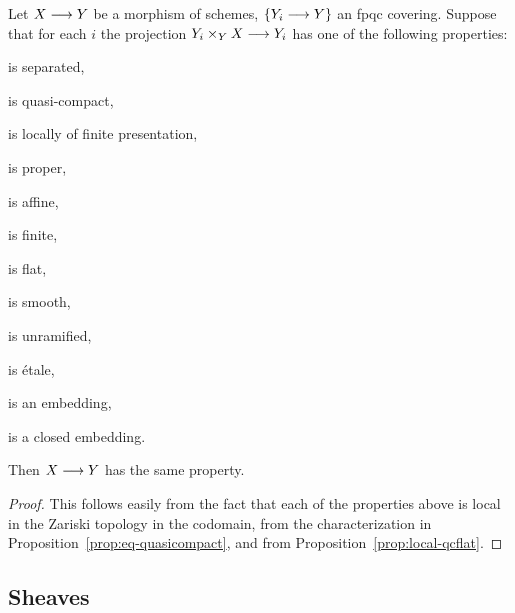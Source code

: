 \begin{2   CONTRAVARIANT FUNCTORS}
\begin{2.3 Sheaves in Grothendieck topologies}
\begin{proposition}\label{prop:local-fpqc}
Let $X \arr Y$ be a morphism of schemes, $\{Y_i \arr Y\}$ an fpqc covering. Suppose that for each $i$ the projection $Y_i \times_{Y} X \arr Y_i$ has one of the following properties:

\begin{enumeratei}

\item is separated,

\item is quasi-compact,

\item is locally of finite presentation,

\item is proper,

\item is affine,

\item is finite,

\item is flat,

\item is smooth, 

\item is unramified,

\item is \'etale,

\item is an embedding,

\item is a closed embedding.

\end{enumeratei}

Then $X \arr Y$ has the same property.
\end{proposition}

\begin{proof}
This follows easily from the fact that each of the properties above is local in the Zariski topology in the codomain, from the characterization  in Proposition~\ref{prop:eq-quasicompact}, and from Proposition~\ref{prop:local-qcflat}.
\end{proof}



\subsection{Sheaves}


\end{2.3 Sheaves in Grothendieck topologies}
\end{2   CONTRAVARIANT FUNCTORS}
